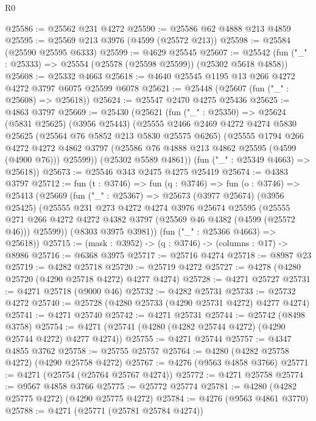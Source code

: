 \begin{lexlean}{R0}
\begin{coremodule}
@25586 := @25562 @231 @4272
@25590 := @25586 @62 @4888 @213 @4859
@25595 := @25569 @213 @3976 (@4599 (@25572 @213))
@25598 := @25584 (@25590 @25595 @6333)
@25599 := @4629 @25545
@25607 := @25542 (fun ("_" : @25333) => @25554 (@25578 (@25598 @25599)) (@25302 @5618 @4858))
@25608 := @25332 @4663
@25618 := @4640 @25545 @1195 @13 @266 @4272 @4272 @3797 @6075 @25599 @6078
@25621 := @25448 (@25607 (fun ("_" : @25608) => @25618))
@25624 := @25547 @2470 @4275 @25436
@25625 := @4863 @3797
@25669 := @25430
    (@25621
      (fun ("_" : @25350) =>
      @25624
        (@5831 @25625)
        (@3956 @25443)
        (@25555
          @2466
          @2469
          @4272
          @4274
          @5830
          @25625
          (@25564 @76 @5852 @213 @5830 @25575 @6265)
          (@25555
            @1794
            @266
            @4272
            @4272
            @4862
            @3797
            (@25586 @76 @4888 @213 @4862 @25595 (@4599 (@4900 @76)))
            @25599))
        (@25302 @5589 @4861))
      (fun ("_" : @25349 @4663) => @25618))
@25673 := @25546 @343 @2475 @4275 @25419
@25674 := @4383 @3797
@25712 := fun (t : @3746) =>
  fun (q : @3746) =>
  fun (o : @3746) =>
  @25413
    (@25669
      (fun ("_" : @25367) =>
      @25673
        (@3977 @25674)
        (@3956 @25425)
        (@25555
          @231
          @273
          @4272
          @4274
          @3976
          @25674
          @25595
          (@25555 @271 @266 @4272 @4272 @4382 @3797 (@25569 @46 @4382 (@4599 (@25572 @46))) @25599))
        (@8303 @3975 @3981))
      (fun ("_" : @25366 @4663) => @25618))
@25715 := (mask : @3952) -> (q : @3746) -> (columns : @17) -> @8986
@25716 := @6368 @3975
@25717 := @25716 @4274
@25718 := @8987 @23
@25719 := @4282 @25718
@25720 := @25719 @4272
@25727 := @4278 (@4280 @25720 (@4290 @25718 @4272) @4277 @4274)
@25728 := @4271 @25727
@25731 := @4271 @25718 (@9000 @46)
@25732 := @4282 @25731
@25733 := @25732 @4272
@25740 := @25728 (@4280 @25733 (@4290 @25731 @4272) @4277 @4274)
@25741 := @4271 @25740
@25742 := @4271 @25731
@25744 := @25742 (@8498 @3758)
@25754 := @4271 (@25741 (@4280 (@4282 @25744 @4272) (@4290 @25744 @4272) @4277 @4274))
@25755 := @4271 @25744
@25757 := @4347 @4855 @3762
@25758 := @25755 @25757
@25764 := @4280 (@4282 @25758 @4272) (@4290 @25758 @4272)
@25767 := @4276 (@9563 @4858 @3766)
@25771 := @4271 (@25754 (@25764 @25767 @4274))
@25772 := @4271 @25758
@25774 := @9567 @4858 @3766
@25775 := @25772 @25774
@25781 := @4280 (@4282 @25775 @4272) (@4290 @25775 @4272)
@25784 := @4276 (@9563 @4861 @3770)
@25788 := @4271 (@25771 (@25781 @25784 @4274))

\end{coremodule}
\end{lexlean}
